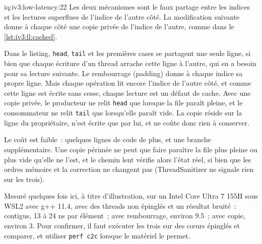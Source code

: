 \begin{solution}{iq:iv3:low-latency:22}
Les deux mécanismes sont le faux partage entre les indices et les lectures superflues de l'indice de l'autre côté. La modification suivante donne à chaque côté une copie privée de l'indice de l'autre, comme dans le \cref{lst:iv3:ll:cached}.
\label{lst:iv3:ll:cached}

Dans le listing, \texttt{head}, \texttt{tail} et les premières cases se partagent une seule ligne, si bien que chaque écriture d'un thread arrache cette ligne à l'autre, qui en a besoin pour sa lecture suivante. Le rembourrage (padding) donne à chaque indice sa propre ligne. Mais chaque opération lit encore l'indice de l'autre côté, et comme cette ligne est écrite sans cesse, chaque lecture est un défaut de cache. Avec une copie privée, le producteur ne relit \texttt{head} que lorsque la file paraît pleine, et le consommateur ne relit \texttt{tail} que lorsqu'elle paraît vide. La copie réside sur la ligne du propriétaire, n'est écrite que par lui, et ne coûte donc rien à conserver.

Le coût est faible~: quelques lignes de code de plus, et une branche supplémentaire. Une copie périmée ne peut que faire paraître la file plus pleine ou plus vide qu'elle ne l'est, et le chemin lent vérifie alors l'état réel, si bien que les ordres mémoire et la correction ne changent pas (ThreadSanitizer ne signale rien sur les trois).

Mesuré quelques fois ici, à titre d'illustration, sur un Intel Core Ultra 7 155H sous WSL2 avec g++ 11.4, avec des threads non épinglés et un résultat bruité~: contigus, 13 à 24 ns par élément~; avec rembourrage, environ 9.5~; avec copie, environ 3. Pour confirmer, il faut exécuter les trois sur des cœurs épinglés et comparer, et utiliser \texttt{perf c2c} lorsque le matériel le permet.

\end{solution}

